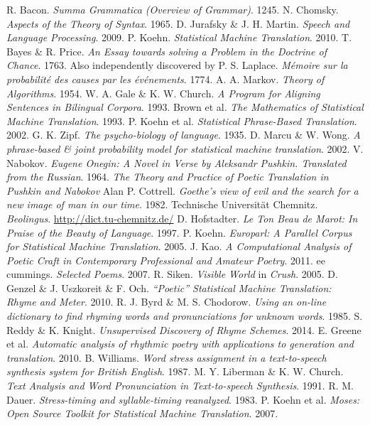 \documentclass[a4,oneside,12pt,onecolumn]{extarticle}
\begin{document}
\begin{thebibliography}{10}
 R. Bacon. {\it Summa Grammatica (Overview of Grammar)}. 1245.
 N. Chomsky. {\it Aspects of the Theory of Syntax}. 1965.
 D. Jurafsky \& J. H. Martin. {\it Speech and Language
    Processing}. 2009.
 P. Koehn. {\it Statistical Machine Translation}. 2010.
 T. Bayes \& R. Price. {\it An Essay towards solving a
    Problem in the Doctrine of Chance}. 1763. Also independently
  discovered by P. S. Laplace. {\it M{\'e}moire sur la probabilit{\'e}
    des causes par les {\'e}v{\'e}nements}. 1774.
 A. A. Markov. {\it Theory of Algorithms}. 1954.
 W. A. Gale \& K. W. Church. {\it A Program for Aligning
    Sentences in Bilingual Corpora}. 1993.
 Brown et al. {\it The Mathematics of Statistical Machine
    Translation}. 1993.
 P. Koehn et al. {\it Statistical Phrase-Based
    Translation}. 2002.
 G. K. Zipf. {\it The psycho-biology of language}. 1935.
 D. Marcu \& W. Wong. {\it A phrase-based \& joint probability model for statistical machine translation}. 2002. 
 V. Nabokov. {\it Eugene Onegin: A Novel in Verse by
    Aleksandr Pushkin. Translated from the Russian}. 1964.
  {\it The Theory and Practice of Poetic Translation in Pushkin and Nabokov}
 Alan P. Cottrell. {\it Goethe's view of evil and the
    search for a new image of man in our time}. 1982.
 Technische Universit{\"a}t Chemnitz. {\it
    Beolingus}. \url{http://dict.tu-chemnitz.de/}
 D. Hofstadter. {\it Le Ton Beau de Marot: In Praise of
    the Beauty of Language}. 1997.
 P. Koehn. {\it Europarl: A Parallel Corpus for
    Statistical Machine Translation}. 2005.
 J. Kao. {\it A Computational Analysis of Poetic Craft in
    Contemporary Professional and Amateur Poetry}. 2011.
 ee cummings. {\it Selected Poems}. 2007.
 R. Siken. {\it Visible World} in {\it Crush}. 2005.
 D. Genzel \& J. Uszkoreit \& F. Och. {\it ``Poetic''
    Statistical Machine Translation: Rhyme and Meter}. 2010.
 R. J. Byrd \& M. S. Chodorow. {\it Using an on-line
    dictionary to find rhyming words and pronunciations for unknown
    words}. 1985.
 S. Reddy \& K. Knight. {\it Unsupervised Discovery of
    Rhyme Schemes}. 2014.
 E. Greene et al. {\it Automatic analysis of rhythmic
    poetry with applications to generation and translation}. 2010.
 B. Williams. {\it Word stress assignment in a
    text-to-speech synthesis system for British English}. 1987.
 M. Y. Liberman \& K. W. Church. {\it Text Analysis and
    Word Pronunciation in Text-to-speech Synthesis}. 1991.
 R. M. Dauer. {\it Stress-timing and syllable-timing
    reanalyzed}. 1983.
 P. Koehn et al. {\it Moses: Open Source Toolkit for
    Statistical Machine Translation}. 2007.
  
\end{thebibliography} 
\end{document}
